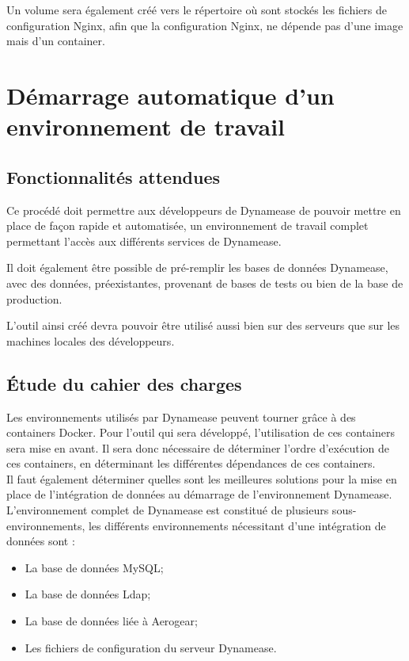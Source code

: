 Un volume sera également créé vers le répertoire où sont stockés les fichiers de configuration Nginx, afin que la configuration Nginx, ne dépende pas d'une image mais d'un container.

\section{Démarrage automatique d'un environnement de travail}

\subsection{Fonctionnalités attendues}

Ce procédé doit permettre aux développeurs de Dynamease de pouvoir mettre en place de façon rapide et automatisée, un environnement de travail complet permettant l'accès aux différents services de Dynamease. 

Il doit également être possible de pré-remplir les bases de données Dynamease, avec des données, préexistantes, provenant de bases de tests ou bien de la base de production.

L'outil ainsi créé devra pouvoir être utilisé aussi bien sur des serveurs que sur les machines locales des développeurs. 

\subsection{Étude du cahier des charges}

Les environnements utilisés par Dynamease peuvent tourner grâce à des containers Docker. Pour l'outil qui sera développé, l'utilisation de ces containers sera mise en avant. Il sera donc nécessaire de déterminer l'ordre d'exécution de ces containers, en déterminant les différentes dépendances de ces containers.\\

Il faut également déterminer quelles sont les meilleures solutions pour la mise en place de l'intégration de données au démarrage de l'environnement Dynamease. L'environnement complet de Dynamease est constitué de plusieurs sous-environnements, les différents environnements nécessitant d'une intégration de données sont :

\begin{itemize}
	\item La base de données MySQL;
	\item La base de données Ldap;
	\item La base de données liée à Aerogear;
	\item Les fichiers de configuration du serveur Dynamease.
\end{itemize}

